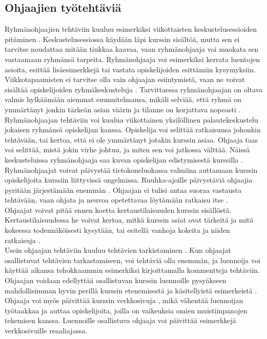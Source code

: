 \documentclass[finnish]{tktltiki2}
\theoremstyle{definition}
\theoremstyle{remark}
\begin{document}
\subsection{Ohjaajien työtehtäviä}
Ryhmänohjaajien tehtäviin kuuluu esimerkiksi viikottaisten keskustelusessioiden pitäminen \cite{Reges88}. Keskustelusessiossa käydään läpi kurssin sisältöä, mutta sen ei tarvitse noudattaa mitään tiukkaa kaavaa, vaan ryhmänohjaaja voi muokata sen vastaamaan ryhmänsä tarpeita. Ryhmänohjaaja voi esimerkiksi kerrata luentojen asioita, esittää lisäesimerkkejä tai vastata opiskelijoiden esittämiin kysymyksiin. Viikkotapaamisten ei tarvitse olla vain ohjaajan esiintymistä, vaan ne voivat sisältää opiskelijoiden ryhmäkeskusteluja \cite{Decker06}. Tarvittaessa ryhmänohjaajan on oltava valmis hylkäämään aiemmat suunnitelmansa, mikäli selviää, että ryhmä on ymmärtänyt jonkin tärkeän asian väärin ja tilanne on korjattava nopeasti \cite{Reges88}.
\\
Ryhmänohjaajan tehtäviin voi kuulua viikottainen yksilöllinen palautekeskustelu jokaisen ryhmänsä opiskelijan kanssa. Opiskelija voi selittää ratkaisunsa johonkin tehtävään, tai kertoa, että ei ole ymmärtänyt jotakin kurssin asiaa. Ohjaaja taas voi selittää, mistä jokin virhe johtuu, ja miten sen voi jatkossa välttää. Näissä keskusteluissa ryhmänohjaaja saa kuvan opiskelijan edistymisestä kurssilla \cite{Reges88,Reges03}.
\\
Ryhmänohjaajat voivat päivystää tietokoneluokassa valmiina auttamaan kurssin opiskelijoita kurssiin liittyvissä ongelmissa. Ruuhka-ajoille päivystäviä ohjaajia pyritään järjestämään enemmän \cite{Reges88, Reges03}. Ohjaajan ei tulisi antaa suoraa vastausta tehtävään, vaan ohjata ja neuvoa opetettavaa löytämään ratkaisu itse \cite{Gray08}.
\\
Ohjaajat voivat pitää ennen koetta kertaustilaisuuden kurssin sisällöstä. Kertaustilaisuudessa he voivat kertoa, mitkä kurssin asiat ovat tärkeitä ja mitä kokeessa todennäköisesti kysytään, tai esitellä vanhoja kokeita ja niiden ratkaisuja \cite{Decker06}.
\\
Usein ohjaajan tehtäviin kuuluu tehtävien tarkistaminen \cite{Dickson11}. Kun ohjaajat osallistuvat tehtävien tarkastamiseen, voi tehtäviä olla enemmän, ja luennoija voi käyttää aikansa tehokkaammin esimerkiksi kirjoittamalla kommentteja tehtäviin.
\\
Ohjaajan voidaan edellyttää osallistuvan kurssin luennoille pysyäkseen mahdollisimman hyvin perillä kurssin etenemisestä ja käsitellyistä esimerkeistä \cite{Reges03, Decker06}. Ohjaaja voi myös päivittää kurssin verkkosivuja \cite{Dickson11}, mikä vähentää luennoijan työtaakkaa ja auttaa opiskelijoita, joilla on vaikeuksia omien muistiinpanojen tekemisen kanssa. Luennoille osallistuva ohjaaja voi päivittää esimerkkejä verkkosivuille reaaliajassa.
\end{document}
